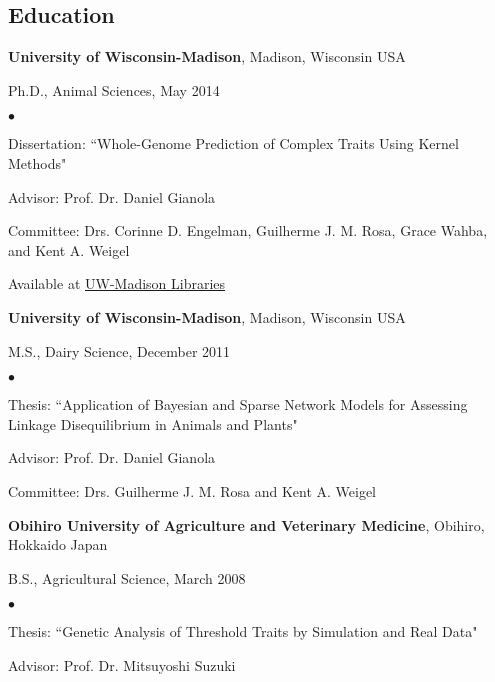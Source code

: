 \documentclass[margin,line,10pt]{res}
\newenvironment{list1}{
  \begin{list}{\ding{113}}{%
      \setlength{\itemsep}{0in}
      \setlength{\parsep}{0in} \setlength{\parskip}{0in}
      \setlength{\topsep}{0in} \setlength{\partopsep}{0in} 
      \setlength{\leftmargin}{0.17in}}}{\end{list}}
\newenvironment{list2}{
  \begin{list}{$\bullet$}{%
      \setlength{\itemsep}{0in}
      \setlength{\parsep}{0in} \setlength{\parskip}{0in}
      \setlength{\topsep}{0in} \setlength{\partopsep}{0in} 
      \setlength{\leftmargin}{0.2in}}}{\end{list}}
\begin{document}
\begin{resume}
\section{\sc Education}

{\bf University of Wisconsin-Madison}, Madison, Wisconsin USA\\
\vspace*{-.1in}
\begin{list1}
\item[] Ph.D., Animal Sciences, May 2014
\begin{list2}
\vspace*{.05in}
\item Dissertation: ``Whole-Genome Prediction of Complex Traits Using Kernel Methods" 
\item Advisor: Prof. Dr. Daniel Gianola 
\item Committee: Drs. Corinne D. Engelman, Guilherme J. M. Rosa, Grace Wahba, and Kent A. Weigel
\item Available at  \textcolor{blue}{\href{https://search.library.wisc.edu/catalog/9910205835702121}{UW-Madison Libraries}} 
\end{list2}
\vspace*{.05in}
\end{list1}





{\bf University of Wisconsin-Madison}, Madison, Wisconsin USA\\
\vspace*{-.1in}
\begin{list1}
\item[] M.S., Dairy Science, December 2011
\begin{list2}
\vspace*{.05in}
\item Thesis: ``Application of Bayesian and Sparse Network Models for Assessing Linkage Disequilibrium in Animals and Plants" 
\item Advisor: Prof. Dr. Daniel Gianola 
\item Committee: Drs. Guilherme J. M. Rosa and Kent A. Weigel
\end{list2}
\vspace*{.05in}
\end{list1}


{\bf Obihiro University of Agriculture and Veterinary Medicine}, Obihiro, Hokkaido Japan\\
\vspace*{-.1in}
\begin{list1}
\item[] B.S., Agricultural Science,  March 2008
\begin{list2}
\vspace*{.05in}
\item Thesis:  ``Genetic Analysis of Threshold Traits by Simulation and Real Data" 
\item Advisor: Prof. Dr. Mitsuyoshi Suzuki
\end{list2}
\end{list1}





\end{resume}
\end{document}
